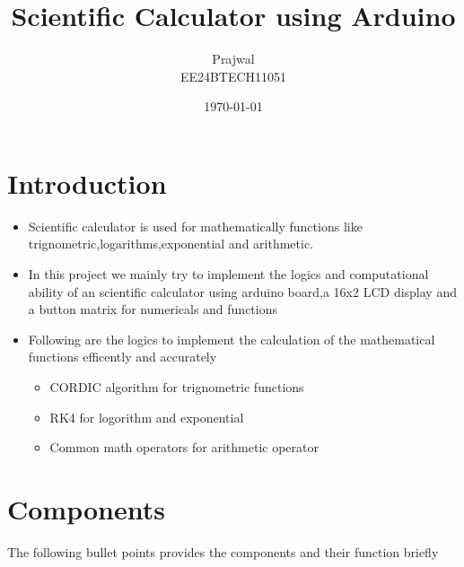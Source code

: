 \documentclass[a4paper,12pt]{article}
\title{\textbf{Scientific Calculator using Arduino}}
\author{Prajwal\\EE24BTECH11051}
\date{\today}
\begin{document}
\maketitle
\newpage
\tableofcontents

\newpage

\section{Introduction}
\begin{itemize}
    \item Scientific calculator is used for mathematically functions like trignometric,logarithms,exponential and arithmetic.
    \item In this project we mainly try to implement the logics and computational ability of an scientific calculator using arduino board,a 16x2 LCD display and a button matrix for numericals and functions
    \item Following are the logics to implement the calculation of the mathematical functions efficently and accurately
    \begin{itemize}
        \item CORDIC algorithm for trignometric functions
        \item RK4 for logorithm and exponential 
        \item Common math operators for arithmetic operator
    \end{itemize}
\end{itemize}

\section{Components}
The following bullet points provides the components and their function briefly
\end{document}
